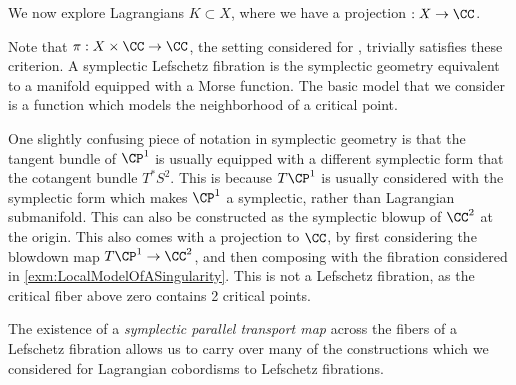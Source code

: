 

We now explore Lagrangians $K\subset X$, where we have a projection $:X\to \CC$. 



Note that $\pi: X\times \CC\to \CC$, the setting considered for , trivially satisfies these criterion. 
A symplectic Lefschetz fibration is the symplectic geometry equivalent to a manifold equipped with a Morse function.
The basic model that we consider is a function which models the neighborhood of a critical point.




\begin{remark}
    One slightly confusing piece of notation in symplectic geometry is that the tangent bundle of $\CP^1$ is usually equipped with a different symplectic form that the cotangent bundle $T^*S^2$.
    This is because $T\CP^1$ is usually considered with the symplectic form which makes $\CP^1$ a symplectic, rather than Lagrangian submanifold.
    This can also be constructed as the symplectic blowup of $\CC^2$ at the origin.
    This also comes with a projection to $\CC$, by first considering the blowdown map $T\CP^1\to \CC^2$, and then composing with the fibration considered in \cref{exm:LocalModelOfASingularity}.
    This is not a Lefschetz fibration, as the critical fiber above zero contains 2 critical points.
\end{remark}
The existence of a \emph{symplectic parallel transport map} across the fibers of a Lefschetz fibration allows us to carry over many of the constructions which we considered for Lagrangian cobordisms to Lefschetz fibrations.




